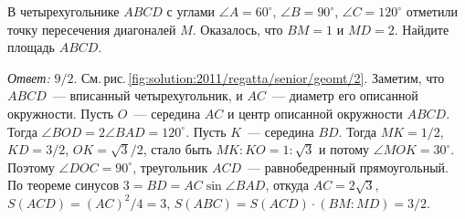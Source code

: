\problem
В четырехугольнике $ABCD$ с углами
$\angle A = 60^{\circ}$, $\angle B = 90^{\circ}$, $\angle C = 120^{\circ}$
отметили точку пересечения диагоналей $M$.
Оказалось, что $BM = 1$ и $MD = 2$.
Найдите площадь $ABCD$.


%
\label{solution:2011/regatta/senior/geomt/2}%
\emph{Ответ:} $9 / 2$.
См.\,рис.\,\ref{fig:solution:2011/regatta/senior/geomt/2}.
Заметим, что $ABCD$~--- вписанный четырехугольник, и $AC$~--- диаметр его
описанной окружности.
Пусть $O$~--- середина $AC$ и центр описанной окружности $ABCD$.
Тогда $\angle BOD = 2 \angle BAD = 120^{\circ}$.
Пусть $K$~--- середина $BD$.
Тогда $MK = 1 / 2$, $KD = 3 / 2$, $OK = \sqrt{3} / 2$, стало быть
$MK : KO = 1 : \sqrt{3}$ и потому $\angle MOK = 30^{\circ}$.
Поэтому $\angle DOC = 90^{\circ}$, треугольник $ACD$~--- равнобедренный
прямоугольный.
По теореме синусов $3 = BD = AC \sin \angle BAD$, откуда
$AC = 2 \sqrt{3}$, $S(ACD) = (AC)^2 / 4 = 3$,
$S(ABC) = S(ACD) \cdot (BM : MD) = 3 / 2$.

\endproblem
